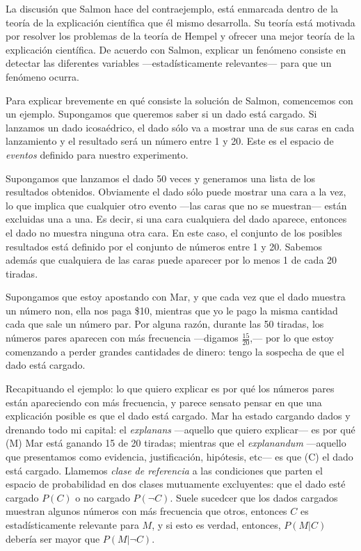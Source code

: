 La discusión que Salmon hace del contraejemplo, está enmarcada dentro
de la teoría de la explicación científica que él mismo desarrolla. Su
teoría está motivada por resolver los problemas de la teoría de Hempel
y ofrecer una mejor teoría de la explicación científica. De acuerdo con
Salmon, explicar un fenómeno consiste en detectar las diferentes
variables ---estadísticamente relevantes--- para que un fenómeno ocurra.

Para explicar brevemente en qué consiste la solución de Salmon,
comencemos con un ejemplo. Supongamos que queremos saber si un dado está
cargado. Si lanzamos un dado icosaédrico, el dado sólo va a mostrar una de
sus caras en cada lanzamiento y el resultado será un número entre 1 y 20.
Este es el espacio de \emph{eventos} definido para nuestro experimento.

Supongamos que lanzamos el dado 50 veces y generamos una lista de los
resultados obtenidos. Obviamente el dado sólo puede mostrar una cara a
la vez, lo que implica que cualquier otro evento ---las caras que no se
muestran--- están excluidas una a una. Es decir, si una cara cualquiera del
dado aparece, entonces el dado no muestra ninguna otra cara. En este caso,
el conjunto de los posibles resultados está definido por el conjunto de números
entre 1 y 20. Sabemos además que cualquiera de las caras puede aparecer por lo
menos 1 de cada 20 tiradas.

Supongamos que estoy apostando con Mar, y que cada vez que el dado muestra un
número non, ella nos paga \$10, mientras que yo le pago la misma cantidad cada
que sale un número par. Por alguna razón, durante las 50 tiradas, los números
pares aparecen con más frecuencia ---digamos $\frac{15}{20}$,--- por lo que
estoy comenzando a perder grandes cantidades de dinero: tengo la sospecha de
que el dado está cargado.

Recapituando el ejemplo: lo que quiero explicar es por qué los números pares
están apareciendo con más frecuencia, y parece sensato pensar en que una
explicación posible es que el dado está cargado. Mar ha estado cargando dados
y drenando todo mi capital: el \emph{explanans} ---aquello que quiero explicar--- es
por qué (M) Mar está ganando 15 de 20 tiradas; mientras que el \emph{explanandum}
---aquello que presentamos como evidencia, justificación, hipótesis, etc--- es que
(C) el dado está cargado. Llamemos \emph{clase de referencia} a las condiciones
que parten el espacio de probabilidad en dos clases mutuamente excluyentes: que el
dado esté cargado $P(C)$ o no cargado $P(\neg C)$. Suele sucedcer que los dados
cargados muestran algunos números con más frecuencia que otros, entonces $C$ es
estadísticamente relevante para $M$, y si esto es verdad, entonces,  $P(M|C)$
debería ser mayor que $P(M|\neg C)$.

